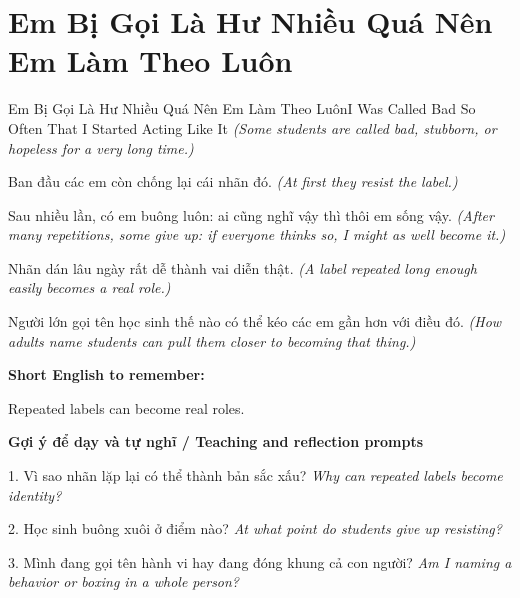 \section{Em Bị Gọi Là Hư Nhiều Quá Nên Em Làm Theo Luôn}
\begin{truyen}{Em Bị Gọi Là Hư Nhiều Quá Nên Em Làm Theo Luôn}{I Was Called Bad So Often That I Started Acting Like It}
\textit{(Some students are called bad, stubborn, or hopeless for a very long time.)}

Ban đầu các em còn chống lại cái nhãn đó.
\textit{(At first they resist the label.)}

Sau nhiều lần, có em buông luôn: ai cũng nghĩ vậy thì thôi em sống vậy.
\textit{(After many repetitions, some give up: if everyone thinks so, I might as well become it.)}

Nhãn dán lâu ngày rất dễ thành vai diễn thật.
\textit{(A label repeated long enough easily becomes a real role.)}

\end{truyen}

\begin{baihoc}
Người lớn gọi tên học sinh thế nào có thể kéo các em gần hơn với điều đó.
\textit{(How adults name students can pull them closer to becoming that thing.)}
\end{baihoc}

\begin{ghinhoanh}
\textbf{Short English to remember:}

Repeated labels can become real roles.

\end{ghinhoanh}

\begin{tuhocnhanh}
\textbf{Gợi ý để dạy và tự nghĩ / Teaching and reflection prompts}

1. Vì sao nhãn lặp lại có thể thành bản sắc xấu? \textit{Why can repeated labels become identity?}

2. Học sinh buông xuôi ở điểm nào? \textit{At what point do students give up resisting?}

3. Mình đang gọi tên hành vi hay đang đóng khung cả con người? \textit{Am I naming a behavior or boxing in a whole person?}
\end{tuhocnhanh}
\ngancach

